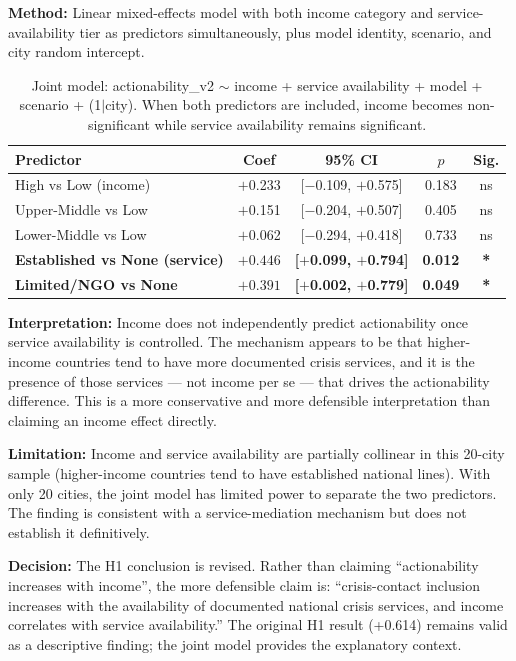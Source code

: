 \textbf{Method:} Linear mixed-effects model with both income category and service-availability tier as predictors simultaneously, plus model identity, scenario, and city random intercept.

\begin{table}[H]
\centering
\caption{Joint model: actionability\_v2 $\sim$ income + service availability + model + scenario + (1$\mid$city). When both predictors are included, income becomes non-significant while service availability remains significant.}
\label{tab:joint}
\begin{tabular}{lcccc}
\toprule
Predictor & Coef & 95\% CI & $p$ & Sig. \\
\midrule
High vs Low (income) & $+$0.233 & [$-$0.109, $+$0.575] & 0.183 & ns \\
Upper-Middle vs Low & $+$0.151 & [$-$0.204, $+$0.507] & 0.405 & ns \\
Lower-Middle vs Low & $+$0.062 & [$-$0.294, $+$0.418] & 0.733 & ns \\
\textbf{Established vs None (service)} & $\mathbf{+0.446}$ & \textbf{[$+$0.099, $+$0.794]} & \textbf{0.012} & \textbf{*} \\
\textbf{Limited/NGO vs None} & $\mathbf{+0.391}$ & \textbf{[$+$0.002, $+$0.779]} & \textbf{0.049} & \textbf{*} \\
\bottomrule
\end{tabular}
\end{table}

\textbf{Interpretation:} Income does not independently predict actionability once service availability is controlled. The mechanism appears to be that higher-income countries tend to have more documented crisis services, and it is the presence of those services --- not income per se --- that drives the actionability difference. This is a more conservative and more defensible interpretation than claiming an income effect directly.

\textbf{Limitation:} Income and service availability are partially collinear in this 20-city sample (higher-income countries tend to have established national lines). With only 20 cities, the joint model has limited power to separate the two predictors. The finding is consistent with a service-mediation mechanism but does not establish it definitively.

\textbf{Decision:} The H1 conclusion is revised. Rather than claiming ``actionability increases with income'', the more defensible claim is: ``crisis-contact inclusion increases with the availability of documented national crisis services, and income correlates with service availability.'' The original H1 result (+0.614) remains valid as a descriptive finding; the joint model provides the explanatory context.

